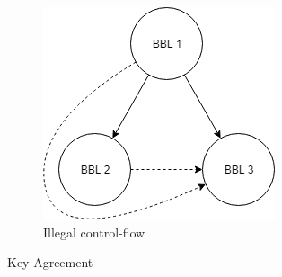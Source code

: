 \documentclass[final]{beamer}
\newlength{\onecolwid}
\newlength{\twocolwid}
\begin{document}
\begin{frame}[t]
\begin{columns}[t]
\begin{column}{\twocolwid}


\begin{columns}[t,totalwidth=\twocolwid] %

\begin{column}{\onecolwid}\vspace{-.6in} %

\begin{figure}
\includegraphics[width=\linewidth]{images/CFGIllegal.png}
\caption{Illegal control-flow}
\vspace{-1cm}
\end{figure}

\begin{block}{Key Agreement}


\end{block}
\end{column}
\end{columns}
\end{column}
\end{columns}
\end{frame}
\end{document}
